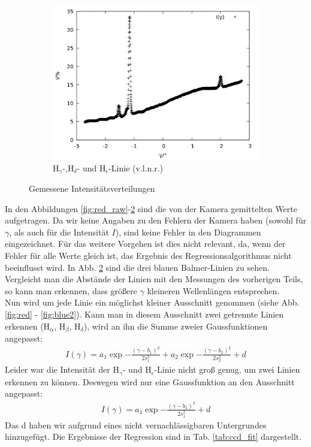 \begin{figure}[h]
\begin{subfigure}[c]{0.49\linewidth}
  	\includegraphics[width=1\linewidth]{data/Balmer/out_blue_raw.png}
  	\caption{H$_\gamma$-,H$_\delta$- und H$_\epsilon$-Linie (v.l.n.r.)}
  	\label{fig:blue_raw}
  \end{subfigure}
  \caption{Gemessene Intensitätsverteilungen}
\end{figure}

In den Abbildungen \ref{fig:red_raw}-\ref{fig:blue_raw} sind die von der Kamera gemittelten Werte aufgetragen. Da wir keine Angaben zu den Fehlern der Kamera haben (sowohl für $\gamma$, als auch für die Intensität $I$), sind keine Fehler in den Diagrammen eingezeichnet. Für das weitere Vorgehen ist dies nicht relevant, da, wenn der Fehler für alle Werte gleich ist, das Ergebnis des Regressionsalgorithmus nicht beeinflusst wird. In Abb. \ref{fig:blue_raw} sind die drei blauen Balmer-Linien zu sehen. Vergleicht man die Abstände der Linien mit den Messungen des vorherigen Teils, so kann man erkennen, dass größere $\gamma$ kleineren Wellenlängen entsprechen.\\

Nun wird um jede Linie ein möglichst kleiner Ausschnitt genommen (siehe Abb. \ref{fig:red} - \ref{fig:blue2}). Kann man in diesem Ausschnitt zwei getrennte Linien erkennen (H$_\alpha$, H$_\beta$, H$_\delta$), wird an ihn die Summe zweier Gaussfunktionen angepasst:
\begin{align*}
I(\gamma) = a_1\exp{-\frac{(\gamma-b_1)^2}{2s_1^2}} + a_2\exp{-\frac{(\gamma-b_2)^2}{2s_2^2}} + d
\end{align*}
Leider war die Intensität der H$_\gamma$- und H$_\epsilon$-Linie nicht groß genug, um zwei Linien erkennen zu können. Deswegen wird nur eine Gaussfunktion an den Ausschnitt angepasst:
\begin{align*}
I(\gamma) = a_1\exp{-\frac{(\gamma-b_1)^2}{2s_1^2}} + d
\end{align*}
Das d haben wir aufgrund eines nicht vernachlässigbaren Untergrundes hinzugefügt. Die Ergebnisse der Regression sind in Tab. \ref{tab:ccd_fit} dargestellt.

